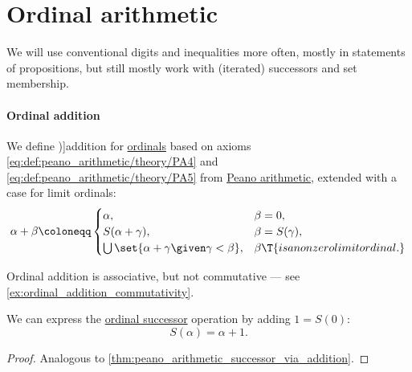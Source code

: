 \section{Ordinal arithmetic}\label{sec:ordinal_arithmetic}

We will use conventional digits and inequalities more often, mostly in statements of propositions, but still mostly work with (iterated) successors and set membership.

\paragraph{Ordinal addition}

\begin{definition}\label{def:ordinal_addition}
  We define \term[en=addition (\cite[def. 2.18]{Jech2006SetTheory})]{addition} for \hyperref[def:ordinal]{ordinals} based on axioms \eqref{eq:def:peano_arithmetic/theory/PA4} and \eqref{eq:def:peano_arithmetic/theory/PA5} from \hyperref[def:peano_arithmetic]{Peano arithmetic}, extended with a case for limit ordinals:
  \begin{equation*}
    \alpha + \beta \coloneqq \begin{cases}
      \alpha,                                               &\beta = 0, \\
      S(\alpha + \gamma),                                   &\beta = S(\gamma), \\
      \bigcup\set{ \alpha + \gamma \given \gamma < \beta }, &\beta \T{is a nonzero limit ordinal.}
    \end{cases}
  \end{equation*}
\end{definition}
\begin{comments}
  \item Ordinal addition is associative, but not commutative --- see \cref{ex:ordinal_addition_commutativity}.
\end{comments}

\begin{proposition}\label{thm:ordinal_arithmetic_successor_via_addition}
  We can express the \hyperref[def:ordinal_successor]{ordinal successor} operation by adding \( 1 = S(0) \):
  \begin{equation*}
    S(\alpha) = \alpha + 1.
  \end{equation*}
\end{proposition}
\begin{proof}
  Analogous to \cref{thm:peano_arithmetic_successor_via_addition}.
\end{proof}

